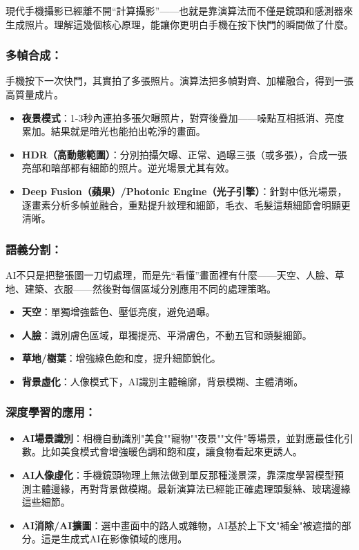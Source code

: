 
現代手機攝影已經離不開“計算攝影”——也就是靠演算法而不僅是鏡頭和感測器來生成照片。理解這幾個核心原理，能讓你更明白手機在按下快門的瞬間做了什麼。

\subsubsection*{多幀合成：}

手機按下一次快門，其實拍了多張照片。演算法把多幀對齊、加權融合，得到一張高質量成片。

\begin{itemize}
  \item \textbf{夜景模式}：1-3秒內連拍多張欠曝照片，對齊後疊加——噪點互相抵消、亮度累加。結果就是暗光也能拍出乾淨的畫面。
  \item \textbf{HDR（高動態範圍）}：分別拍攝欠曝、正常、過曝三張（或多張），合成一張亮部和暗部都有細節的照片。逆光場景尤其有效。
  \item \textbf{Deep Fusion（蘋果）/Photonic Engine（光子引擎）}：針對中低光場景，逐畫素分析多幀並融合，重點提升紋理和細節，毛衣、毛髮這類細節會明顯更清晰。
\end{itemize}

\subsubsection*{語義分割：}

AI不只是把整張圖一刀切處理，而是先“看懂”畫面裡有什麼——天空、人臉、草地、建築、衣服——然後對每個區域分別應用不同的處理策略。

\begin{itemize}
  \item \textbf{天空}：單獨增強藍色、壓低亮度，避免過曝。
  \item \textbf{人臉}：識別膚色區域，單獨提亮、平滑膚色，不動五官和頭髮細節。
  \item \textbf{草地/樹葉}：增強綠色飽和度，提升細節銳化。
  \item \textbf{背景虛化}：人像模式下，AI識別主體輪廓，背景模糊、主體清晰。
\end{itemize}

\subsubsection*{深度學習的應用：}

\begin{itemize}
  \item \textbf{AI場景識別}：相機自動識別"美食""寵物""夜景""文件"等場景，並對應最佳化引數。比如美食模式會增強暖色調和飽和度，讓食物看起來更誘人。
  \item \textbf{AI人像虛化}：手機鏡頭物理上無法做到單反那種淺景深，靠深度學習模型預測主體邊緣，再對背景做模糊。最新演算法已經能正確處理頭髮絲、玻璃邊緣這些細節。
  \item \textbf{AI消除/AI擴圖}：選中畫面中的路人或雜物，AI基於上下文"補全"被遮擋的部分。這是生成式AI在影像領域的應用。
\end{itemize}

